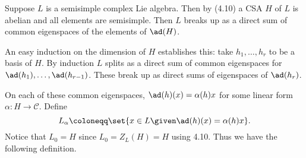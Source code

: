 Suppose $L$ is a semisimple complex Lie algebra. Then by (4.10) a CSA $H$ of $L$
is abelian and all elements are semisimple. Then $L$ breaks up as a direct
sum of common eigenspaces of the elements of $\ad(H)$.

An easy induction on the dimension of $H$ establishes this: take $h_1, \ldots, h_r$
to be a basis of $H$. By induction $L$ splits as a direct sum of common eigenspaces
for $\ad(h_1), \ldots, \ad(h_{r-1})$. These break up as direct sums of eigenspaces of
$\ad(h_r)$.

On each of these common eigenspaces, $\ad(h)(x) = \alpha(h)x$ for some linear form
$\alpha\colon H\to \mathcal{C}$. Define
\[ L_\alpha\coloneqq\set{x \in L\given \ad(h)(x) = \alpha(h)x}. \]
Notice that $L_0 = H$ since $L_0 = Z_L(H) = H$ using 4.10. Thus we have the
following definition.

